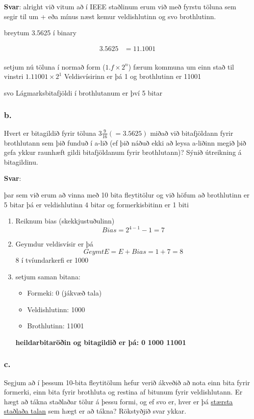 \documentclass{article}
\begin{document}
\textbf{Svar}:
alright við vitum að í IEEE staðlinum erum við með fyrstu töluna sem segir til um + eða mínus næst kemur veldishlutinn og svo brothlutinn.

breytum 3.5625 í binary

\begin{align*}
    3.5625 &= 11.1001 \\
\end{align*}

setjum nú töluna í normað form ($1.f \times 2^n$) 
færum kommuna um einn stað til vinstri $1.11001 \times 2^1$ 
Veldisvísirinn er þá 1 og brothlutinn er 11001

svo Lágmarksbitafjöldi í brothlutanum er því 5 bitar


\subsubsection{b.}Hvert er bitagildið fyrir töluna $3 \frac{9}{16}(=3.5625)$ miðað við bitafjöldann fyrir brothlutann sem
þið funduð í a-lið (ef þið náðuð ekki að leysa a-liðinn megið þið gefa ykkur
raunhæft gildi bitafjöldanum fyrir brothlutann)? Sýnið útreikning á bitagildinu.


\textbf{Svar}:

þar sem við erum að vinna með 10 bita fleytitölur og við höfum að brothlutinn er 5 bitar
þá er veldishlutinn 4 bitar og formerkisbitinn er 1 biti

\begin{enumerate}
    \item Reiknum bias (skekkjustuðulinn)
    \[Bias = 2^{4-1} - 1 = 7\]
    \item Geymdur veldisvísir er þá
    \[GeymtE = E + Bias = 1 + 7 = 8\]
    8 í tvíundarkerfi er 1000
    \item setjum saman bitana:
    \begin{itemize}
        \item Formeki: 0 (jákvæð tala)
        \item Veldishlutinn: 1000
        \item Brothlutinn: 11001
    \end{itemize}

    \textbf{heildarbitaröðin og bitagildið er þá: 0 1000 11001}
\end{enumerate}



\subsubsection{c.} Segjum að í þessum 10-bita fleytitölum hefur verið ákveðið að nota einn bita
fyrir formerki, einn bita fyrir brothluta og restina af bitunum fyrir veldishlutann.
Er hægt að tákna staðlaðar tölur á þessu formi, og ef svo er, hver er þá \underline{stærsta
staðlaða talan} sem hægt er að tákna? Rökstyðjið svar ykkar.
\end{document}
